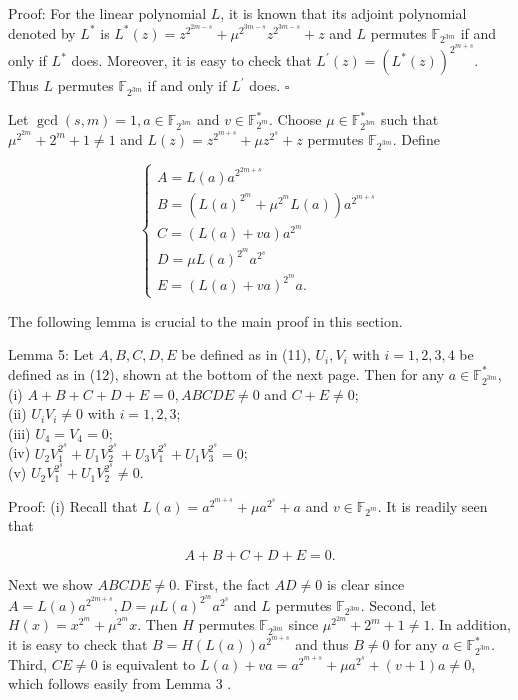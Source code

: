 \documentclass[10pt]{article}
\begin{document}
Proof: For the linear polynomial $L$, it is known that its adjoint polynomial denoted by $L^{*}$ is $L^{*}(z)=z^{2^{2 m-s}}+ \mu^{2^{3 m-s}} z^{2^{3 m-s}}+z$ and $L$ permutes $\mathbb{F}_{2^{3 m}}$ if and only if $L^{*}$ does. Moreover, it is easy to check that $L^{\prime}(z)=\left(L^{*}(z)\right)^{2^{m+s}}$. Thus $L$ permutes $\mathbb{F}_{2^{3 m}}$ if and only if $L^{\prime}$ does. \(\square\)

Let $\operatorname{gcd}(s, m)=1, a \in \mathbb{F}_{2^{3 m}}$ and $v \in \mathbb{F}_{2^{m}}^{*}$. Choose $\mu \in \mathbb{F}_{2^{3 m}}^{*}$ such that $\mu^{2^{2 m}}+2^{m}+1 \neq 1$ and $L(z)=z^{2^{m+s}}+\mu z^{2^{s}}+z$ permutes $\mathbb{F}_{2^{3 m}}$. Define

\[
\left\{\begin{array}{l}
A=L(a) a^{2^{2 m+s}}  \tag{11}\\
B=\left(L(a)^{2^{m}}+\mu^{2^{m}} L(a)\right) a^{2^{m+s}} \\
C=(L(a)+v a) a^{2^{m}} \\
D=\mu L(a)^{2^{m}} a^{2^{s}} \\
E=(L(a)+v a)^{2^{m}} a .
\end{array}\right.
\]

The following lemma is crucial to the main proof in this section.

Lemma 5: Let $A, B, C, D, E$ be defined as in (11), $U_{i}, V_{i}$ with $i=1,2,3,4$ be defined as in (12), shown at the bottom of the next page. Then for any $a \in \mathbb{F}_{2^{3 m}}^{*}$,\\
(i) $A+B+C+D+E=0, A B C D E \neq 0$ and $C+E \neq 0$;\\
(ii) $U_{i} V_{i} \neq 0$ with $i=1,2,3$;\\
(iii) $U_{4}=V_{4}=0$;\\
(iv) $U_{2} V_{1}^{2^{s}}+U_{1} V_{2}^{2^{s}}+U_{3} V_{1}^{2^{s}}+U_{1} V_{3}^{2^{s}}=0$;\\
(v) $U_{2} V_{1}^{2^{s}}+U_{1} V_{2}^{2^{s}} \neq 0$.

Proof: (i) Recall that $L(a)=a^{2^{m+s}}+\mu a^{2^{s}}+a$ and $v \in \mathbb{F}_{2^{m}}$. It is readily seen that

$$
A+B+C+D+E=0 .
$$

Next we show $A B C D E \neq 0$. First, the fact $A D \neq 0$ is clear since $A=L(a) a^{2^{2 m+s}}, D=\mu L(a)^{2^{m}} a^{2^{s}}$ and $L$ permutes $\mathbb{F}_{2^{3 m}}$. Second, let $H(x)=x^{2^{m}}+\mu^{2^{m}} x$. Then $H$ permutes $\mathbb{F}_{2^{3 m}}$ since $\mu^{2^{2 m}}+2^{m}+1 \neq 1$. In addition, it is easy to check that $B=H(L(a)) a^{2^{m+s}}$ and thus $B \neq 0$ for any $a \in \mathbb{F}_{2^{3 m}}^{*}$. Third, $C E \neq 0$ is equivalent to $L(a)+v a=a^{2^{m+s}}+\mu a^{2^{s}}+ (v+1) a \neq 0$, which follows easily from Lemma 3 .
\end{document}
